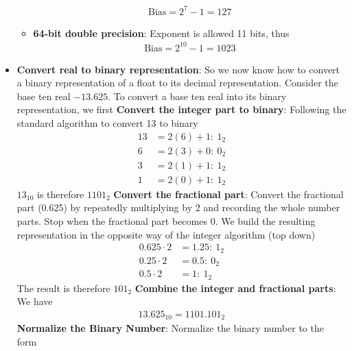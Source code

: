 \documentclass{report}
\begin{document}
\begin{itemize}
\begin{itemize}
                \begin{align*}
                    \text{Bias} = 2^{7} - 1 = 127
                \end{align*}
            \item \textbf{64-bit double precision}: Exponent is allowed 11 bits, thus
                \begin{align*}
                    \text{Bias} = 2^{10} - 1 = 1023
                \end{align*}
        \end{itemize}
    \item \textbf{Convert real to binary representation}: So we now know how to convert a binary representation of a float to its decimal representation. 
        \bigbreak \noindent 
        Consider the base ten real $-13.625$. To convert a base ten real into its binary representation, we first
        \bigbreak \noindent 
        \textbf{Convert the integer part to binary}: Following the standard algorithm to convert 13 to binary
        \begin{align*}
            13 &= 2(6) + 1:\ 1_{2} \\
            6 &= 2(3) + 0:\ 0_{2} \\
            3 &= 2(1) + 1:\ 1_{2} \\
            1 &= 2(0) + 1:\ 1_{2}
        \end{align*}
        $13_{10}$ is therefore $1101_{2}$
        \bigbreak \noindent 
        \textbf{Convert the fractional part}: Convert the fractional part (0.625) by repeatedly multiplying by 2 and recording the whole number parts. Stop when the fractional part becomes 0. We build the resulting representation in the opposite way of the integer algorithm (top down)
        \begin{align*}
            0.625 \cdot 2 &= 1.25:\ 1_{2} \\
            0.25 \cdot 2 &= 0.5:\ 0_{2} \\
            0.5 \cdot 2 &= 1:\ 1_{2}
        \end{align*}
        The result is therefore $101_{2} $
        \bigbreak \noindent 
        \textbf{Combine the integer and fractional parts}: We have
        \begin{align*}
            13.625_{10} = 1101.101_{2}
        \end{align*}
        \bigbreak \noindent 
        \textbf{Normalize the Binary Number}: Normalize the binary number to the form 
        \begin{align*}

\end{align*}
\end{itemize}
\end{document}
